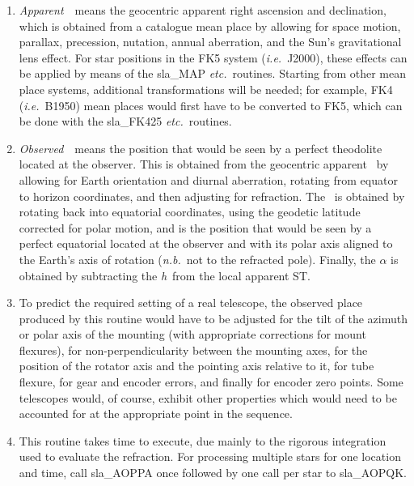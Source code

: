 {\begin{enumerate}
        processed in accordance with the models used.
  \item {\it Apparent}\, \radec\ means the geocentric apparent right ascension
        and declination, which is obtained from a catalogue mean place
        by allowing for space motion, parallax, precession, nutation,
        annual aberration, and the Sun's gravitational lens effect.  For
        star positions in the FK5 system ({\it i.e.}\ J2000), these effects can
        be applied by means of the sla\_MAP {\it etc.}\ routines.  Starting from
        other mean place systems, additional transformations will be
        needed;  for example, FK4 ({\it i.e.}\ B1950) mean places would first
        have to be converted to FK5, which can be done with the
        sla\_FK425 {\it etc.}\ routines.
  \item {\it Observed}\, \azel\ means the position that would be seen by a
        perfect theodolite located at the observer.  This is obtained
        from the geocentric apparent \radec\ by allowing for Earth
        orientation and diurnal aberration, rotating from equator
        to horizon coordinates, and then adjusting for refraction.
        The \hadec\ is obtained by rotating back into equatorial
        coordinates, using the geodetic latitude corrected for polar
        motion, and is the position that would be seen by a perfect
        equatorial located at the observer and with its polar axis
        aligned to the Earth's axis of rotation ({\it n.b.}\ not to the
        refracted pole).  Finally, the $\alpha$ is obtained by subtracting
        the {\it h}\, from the local apparent ST.
  \item To predict the required setting of a real telescope, the
        observed place produced by this routine would have to be
        adjusted for the tilt of the azimuth or polar axis of the
        mounting (with appropriate corrections for mount flexures),
        for non-perpendicularity between the mounting axes, for the
        position of the rotator axis and the pointing axis relative
        to it, for tube flexure, for gear and encoder errors, and
        finally for encoder zero points.  Some telescopes would, of
        course, exhibit other properties which would need to be
        accounted for at the appropriate point in the sequence.
  \item This routine takes time to execute, due mainly to the
        rigorous integration used to evaluate the refraction.
        For processing multiple stars for one location and time,
        call sla\_AOPPA once followed by one call per star to sla\_AOPQK.

\end{enumerate}}

